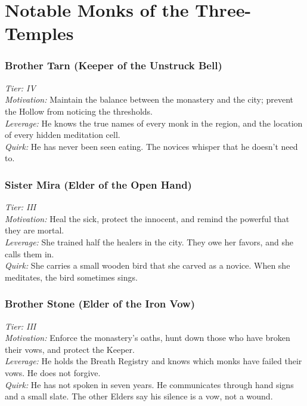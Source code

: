 \documentclass[11pt]{book}
\begin{document}
\chapter{Notable Monks of the Three-Temples}

\subsection*{Brother Tarn (Keeper of the Unstruck Bell)}

\textit{Tier: IV} \\
\textit{Motivation:} Maintain the balance between the monastery and the city; prevent the Hollow from noticing the thresholds. \\
\textit{Leverage:} He knows the true names of every monk in the region, and the location of every hidden meditation cell. \\
\textit{Quirk:} He has never been seen eating. The novices whisper that he doesn't need to.

\subsection*{Sister Mira (Elder of the Open Hand)}

\textit{Tier: III} \\
\textit{Motivation:} Heal the sick, protect the innocent, and remind the powerful that they are mortal. \\
\textit{Leverage:} She trained half the healers in the city. They owe her favors, and she calls them in. \\
\textit{Quirk:} She carries a small wooden bird that she carved as a novice. When she meditates, the bird sometimes sings.

\subsection*{Brother Stone (Elder of the Iron Vow)}

\textit{Tier: III} \\
\textit{Motivation:} Enforce the monastery's oaths, hunt down those who have broken their vows, and protect the Keeper. \\
\textit{Leverage:} He holds the Breath Registry and knows which monks have failed their vows. He does not forgive. \\
\textit{Quirk:} He has not spoken in seven years. He communicates through hand signs and a small slate. The other Elders say his silence is a vow, not a wound.
\end{document}
